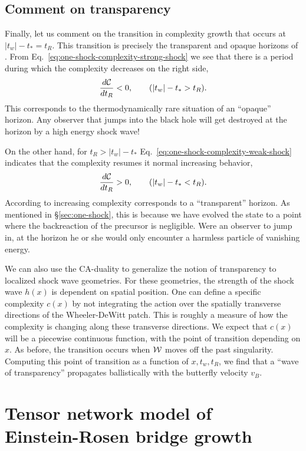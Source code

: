 \documentclass[12pt]{article}
\numberwithin{equation}{section}
\newcommand{\be}{\begin{equation}}
\newcommand{\ee}{\end{equation}}
\def\CC{{\cal C}}
\def\CW{{\cal W}}
\renewcommand{\eqref}[1]{Eq.~\ref{#1}}
\begin{document}
\subsection{Comment on transparency}

Finally, let us comment on the transition in complexity growth that occurs at $|t_w| - t_* = t_R$. This transition is precisely the transparent and opaque horizons of \cite{opacity}. From \eqref{eq:one-shock-complexity-strong-shock} we see that there is a period during which the complexity decreases on the right side,
\be
\frac{d\CC}{dt_R} < 0, \qquad (|t_w| - t_* > t_R).
\ee
This corresponds to the thermodynamically rare situation of an ``opaque'' horizon. Any observer that jumps into the black hole will get destroyed at the horizon by a high energy shock wave!

On the other hand, for $t_R > |t_w| - t_*$
 \eqref{eq:one-shock-complexity-weak-shock} indicates that the complexity resumes it normal increasing behavior,
\be
\frac{d\CC}{dt_R} > 0, \qquad (|t_w| - t_* < t_R).
\ee
According to \cite{opacity} increasing complexity
corresponds to a ``transparent'' horizon. As mentioned in \S\ref{sec:one-shock}, this is because we have evolved the state to a point where the backreaction of the precursor is negligible. Were an observer to jump in, at the horizon he or she would only encounter a harmless particle of vanishing energy.

We can also use the CA-duality to generalize the notion of transparency to localized shock wave geometries. For these geometries, the strength of the shock wave $h(x)$ is dependent on spatial position.
One can define a specific complexity $c(x)$ by not integrating the action over the spatially transverse directions of the Wheeler-DeWitt patch. This is roughly a measure of how the complexity is changing along these transverse  directions. We expect that $c(x)$  will be a piecewise continuous function, with the point of transition depending on $x$. As before, the transition occurs when $\CW$ moves off the past singularity. Computing this point of transition as a function of $x, t_w, t_R$, we find that a ``wave of transparency'' propagates ballistically with the butterfly velocity $v_B$.


\section{Tensor network model of\\ Einstein-Rosen bridge growth}
\label{sec:tensornetworks}
\end{document}
